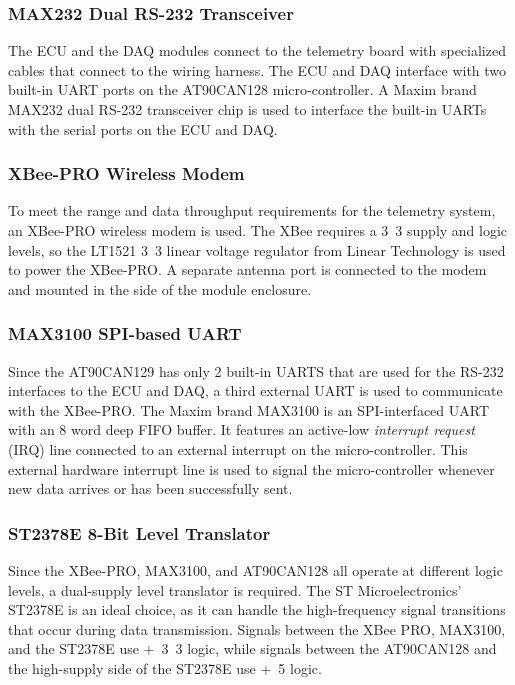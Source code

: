 \subsubsection{MAX232 Dual RS-232 Transceiver}

The ECU and the DAQ modules connect to the telemetry board with specialized cables that connect to the wiring harness. The ECU and DAQ interface with two built-in UART ports on the AT90CAN128 micro-controller. A Maxim brand MAX232 dual RS-232 transceiver chip is used to interface the built-in UARTs with the serial ports on the ECU and DAQ.

\subsubsection{XBee-PRO Wireless Modem}

To meet the range and data throughput requirements for the telemetry system, an XBee-PRO wireless modem is used. The XBee requires a \unit{3.3}{\volt} supply and logic levels, so the LT1521 \unit{3.3}{\volt} linear voltage regulator from Linear Technology is used to power the XBee-PRO. A separate antenna port is connected to the modem and mounted in the side of the module enclosure.

\subsubsection{MAX3100 SPI-based UART}

Since the AT90CAN129 has only 2 built-in UARTS that are used for the RS-232 interfaces to the ECU and DAQ, a third external UART is used to communicate with the XBee-PRO. The Maxim brand MAX3100 is an SPI-interfaced UART with an 8 word deep FIFO buffer. It features an active-low \emph{interrupt request} (IRQ) line connected to an external interrupt on the micro-controller. This external hardware interrupt line is used to signal the micro-controller whenever new data arrives or has been successfully sent.

\subsubsection{ST2378E 8-Bit Level Translator}

Since the XBee-PRO, MAX3100, and AT90CAN128 all operate at different logic levels, a dual-supply level translator is required. The ST Microelectronics' ST2378E is an ideal choice, as it can handle the high-frequency signal transitions that occur during data transmission. Signals between the XBee PRO, MAX3100, and the ST2378E use \unit{+3.3}{\volt} logic, while signals between the AT90CAN128 and the high-supply side of the ST2378E use \unit{+5}{\volt} logic.

